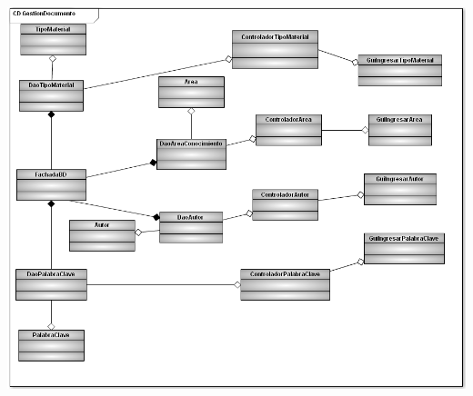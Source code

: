 	\begin{minipage}[c]{1\linewidth}
	\centering
	\includegraphics[width=21cm, height=17cm, angle=90]{diagramasClase/DiagramaClases5}
	\end{minipage}
			
		
			
			
